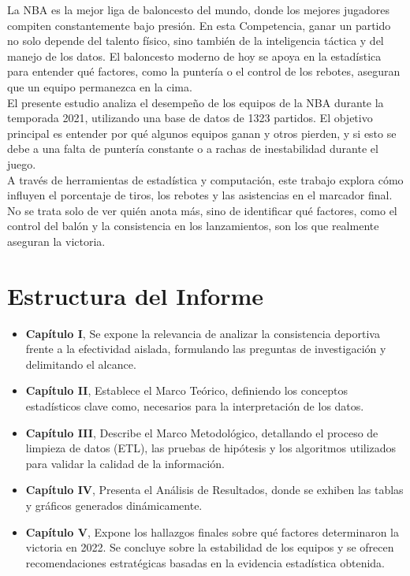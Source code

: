 \documentclass[oneside,11pt]{Latex/Classes/PhDthesisPSnPDF}
\begin{document}
La NBA es la mejor liga de baloncesto del mundo, donde los mejores
jugadores compiten constantemente bajo presión. En esta Competencia,
ganar un partido no solo depende del talento físico, sino también de la
inteligencia táctica y del manejo de los datos. El baloncesto moderno de
hoy se apoya en la estadística para entender qué factores, como la
puntería o el control de los rebotes, aseguran que un equipo permanezca
en la cima.\\

El presente estudio analiza el desempeño de los equipos de la NBA
durante la temporada 2021, utilizando una base de datos de 1323
partidos. El objetivo principal es entender por qué algunos equipos
ganan y otros pierden, y si esto se debe a una falta de puntería
constante o a rachas de inestabilidad durante el juego.\\

A través de herramientas de estadística y computación, este trabajo
explora cómo influyen el porcentaje de tiros, los rebotes y las
asistencias en el marcador final. No se trata solo de ver quién anota
más, sino de identificar qué factores, como el control del balón y la
consistencia en los lanzamientos, son los que realmente aseguran la
victoria.\newpage

\section*{Estructura del Informe}

\begin{itemize}

    \item \textbf{Capítulo I}, Se expone la relevancia de analizar la consistencia deportiva frente a la efectividad aislada, formulando las preguntas de investigación y delimitando el alcance.
    
    \item \textbf{Capítulo II}, Establece el Marco Teórico, definiendo los conceptos estadísticos clave como, necesarios para la interpretación de los datos.
    
    \item \textbf{Capítulo III}, Describe el Marco Metodológico, detallando el proceso de limpieza de datos (ETL), las pruebas de hipótesis y los algoritmos utilizados para validar la calidad de la información.
    
    \item \textbf{Capítulo IV}, Presenta el Análisis de Resultados, donde se exhiben las tablas y gráficos generados dinámicamente.
    
    \item \textbf{Capítulo V}, Expone los hallazgos finales sobre qué factores determinaron la victoria en 2022. Se concluye sobre la estabilidad de los equipos y se ofrecen recomendaciones estratégicas basadas en la evidencia estadística obtenida.
    
\end{itemize}
\end{document}

